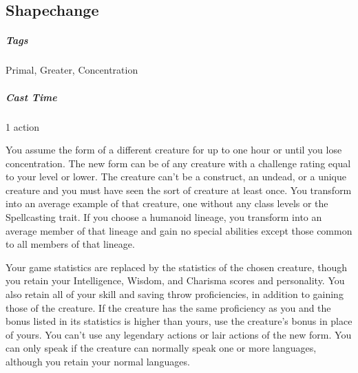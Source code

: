 








\subsection{Shapechange\label{spell:shapechange}}
\subparagraph*{Tags} Primal, Greater, Concentration
\subparagraph*{Cast Time} 1 action

You assume the form of a different creature for up to one hour or until you lose concentration. The new form can be of any creature with a challenge rating equal to your level or lower. The creature can’t be a construct, an undead, or a unique creature and you must have seen the sort of creature at least once. You transform into an average example of that creature, one without any class levels or the Spellcasting trait. If you choose a humanoid lineage, you transform into an average member of that lineage and gain no special abilities except those common to all members of that lineage.

Your game statistics are replaced by the statistics of the chosen creature, though you retain your Intelligence, Wisdom, and Charisma scores and personality. You also retain all of your skill and saving throw proficiencies, in addition to gaining those of the creature. If the creature has the same proficiency as you and the bonus listed in its statistics is higher than yours, use the creature’s bonus in place of yours. You can’t use any legendary actions or lair actions of the new form. You can only speak if the creature can normally speak one or more languages, although you retain your normal languages.

